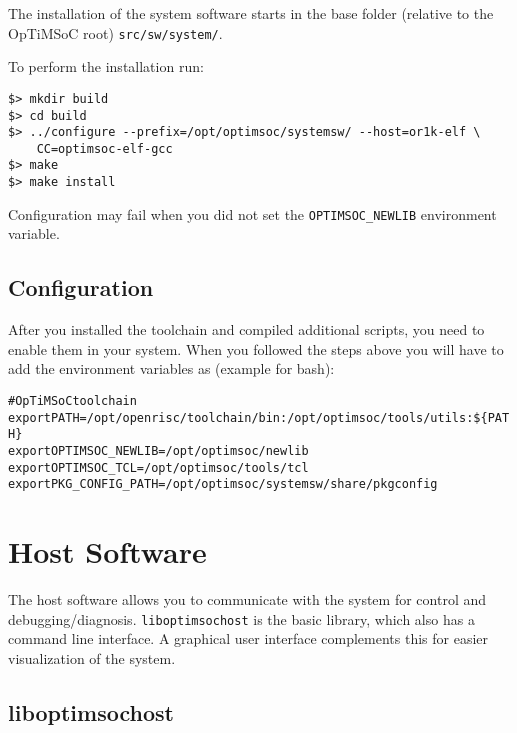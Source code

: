 The installation of the system software starts in the base folder
(relative to the OpTiMSoC root) \verb|src/sw/system/|.




To perform the installation run:

\begin{verbatim}
$> mkdir build
$> cd build
$> ../configure --prefix=/opt/optimsoc/systemsw/ --host=or1k-elf \
    CC=optimsoc-elf-gcc
$> make
$> make install
\end{verbatim}

Configuration may fail when you did not set the \verb|OPTIMSOC_NEWLIB|
environment variable.

\subsection{Configuration}

After you installed the toolchain and compiled additional scripts, you
need to enable them in your system. When you followed the steps above
you will have to add the environment variables as (example for bash):

\begin{alltt}
# OpTiMSoC toolchain
export PATH=/opt/openrisc/toolchain/bin:/opt/optimsoc/tools/utils:\$\{PATH\}
export OPTIMSOC_NEWLIB=/opt/optimsoc/newlib
export OPTIMSOC_TCL=/opt/optimsoc/tools/tcl
export PKG_CONFIG_PATH=/opt/optimsoc/systemsw/share/pkgconfig
\end{alltt}

\section{Host Software}

The host software allows you to communicate with the system for
control and debugging/diagnosis. \verb|liboptimsochost| is the basic
library, which also has a command line interface. A graphical user
interface complements this for easier visualization of the system.

\subsection{liboptimsochost}

